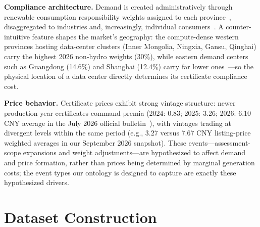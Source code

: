 \documentclass[sigconf,anonymous,review]{acmart}
\begin{document}
\textbf{Compliance architecture.} Demand is created administratively through renewable consumption responsibility weights assigned to each province~\cite{weight2025notice}, disaggregated to industries and, increasingly, individual consumers~\cite{measure2026order}. A counter-intuitive feature shapes the market's geography: the compute-dense western provinces hosting data-center clusters (Inner Mongolia, Ningxia, Gansu, Qinghai) carry the highest 2026 non-hydro weights (30\%), while eastern demand centers such as Guangdong (14.6\%) and Shanghai (12.4\%) carry far lower ones~\cite{weight2025notice}---so the physical location of a data center directly determines its certificate compliance cost.

\textbf{Price behavior.} Certificate prices exhibit strong vintage structure: newer production-year certificates command premia (2024: 0.83; 2025: 3.26; 2026: 6.10 CNY average in the July 2026 official bulletin~\cite{nea2026jul}), with vintages trading at divergent levels within the same period (e.g., 3.27 versus 7.67 CNY listing-price weighted averages in our September 2026 snapshot). These events---assessment-scope expansions and weight adjustments---are hypothesized to affect demand and price formation, rather than prices being determined by marginal generation costs; the event types our ontology is designed to capture are exactly these hypothesized drivers.

\section{Dataset Construction}
\end{document}
